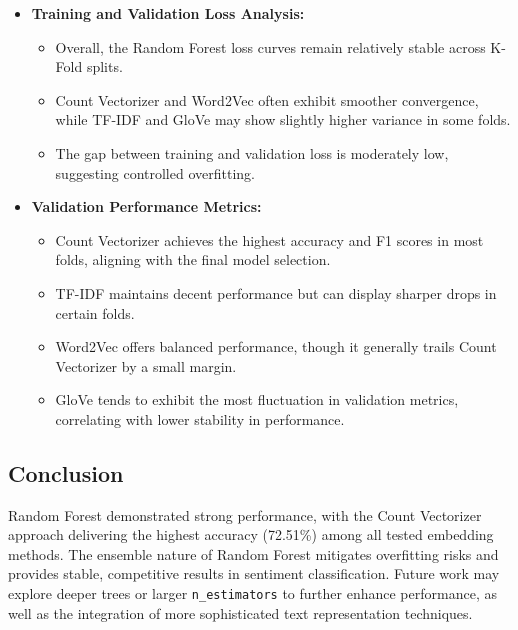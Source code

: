 \begin{itemize}
    \item \textbf{Training and Validation Loss Analysis:}
    \begin{itemize}
        \item Overall, the Random Forest loss curves remain relatively stable across K-Fold splits.
        \item Count Vectorizer and Word2Vec often exhibit smoother convergence, while TF-IDF and GloVe may show slightly higher variance in some folds.
        \item The gap between training and validation loss is moderately low, suggesting controlled overfitting.
    \end{itemize}
    
    \item \textbf{Validation Performance Metrics:}
    \begin{itemize}
        \item Count Vectorizer achieves the highest accuracy and F1 scores in most folds, aligning with the final model selection.
        \item TF-IDF maintains decent performance but can display sharper drops in certain folds.
        \item Word2Vec offers balanced performance, though it generally trails Count Vectorizer by a small margin.
        \item GloVe tends to exhibit the most fluctuation in validation metrics, correlating with lower stability in performance.
    \end{itemize}
\end{itemize}

\subsection{Conclusion}

Random Forest demonstrated strong performance, with the Count Vectorizer approach delivering the highest accuracy (72.51\%) among all tested embedding methods. The ensemble nature of Random Forest mitigates overfitting risks and provides stable, competitive results in sentiment classification. Future work may explore deeper trees or larger \texttt{n\_estimators} to further enhance performance, as well as the integration of more sophisticated text representation techniques.

